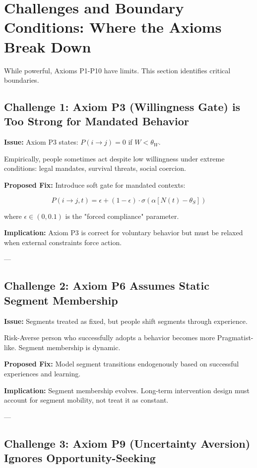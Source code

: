 \documentclass[11pt, a4paper]{article}
\begin{document}
\section{Challenges and Boundary Conditions: Where the Axioms Break Down}

While powerful, Axioms P1-P10 have limits. This section identifies critical boundaries.

\subsection{Challenge 1: Axiom P3 (Willingness Gate) is Too Strong for Mandated Behavior}

\textbf{Issue:} Axiom P3 states: $P(i \to j) = 0$ if $W < \theta_W$.

Empirically, people sometimes act despite low willingness under extreme conditions: legal mandates, survival threats, social coercion.

\textbf{Proposed Fix:} Introduce soft gate for mandated contexts:

\begin{equation}
P(i \to j, t) = \epsilon + (1-\epsilon) \cdot \sigma\left( \alpha [N(t) - \theta_S] \right)
\end{equation}

where $\epsilon \in (0, 0.1)$ is the "forced compliance" parameter.

\textbf{Implication:} Axiom P3 is correct for voluntary behavior but must be relaxed when external constraints force action.

---

\subsection{Challenge 2: Axiom P6 Assumes Static Segment Membership}

\textbf{Issue:} Segments treated as fixed, but people shift segments through experience.

Risk-Averse person who successfully adopts a behavior becomes more Pragmatist-like. Segment membership is dynamic.

\textbf{Proposed Fix:} Model segment transitions endogenously based on successful experiences and learning.

\textbf{Implication:} Segment membership evolves. Long-term intervention design must account for segment mobility, not treat it as constant.

---

\subsection{Challenge 3: Axiom P9 (Uncertainty Aversion) Ignores Opportunity-Seeking}
\end{document}
